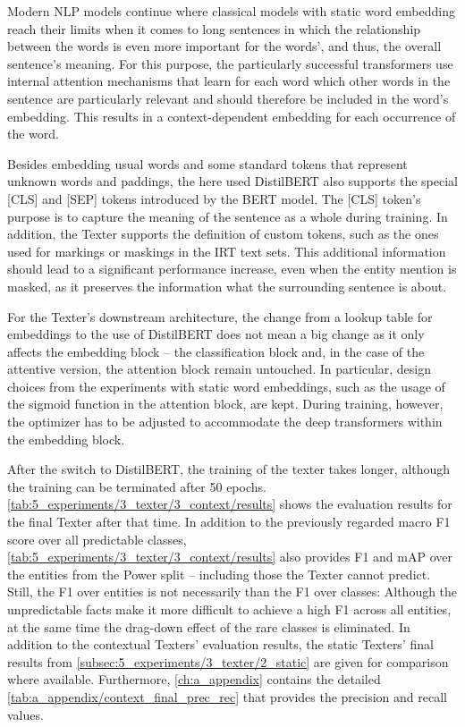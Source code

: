 Modern NLP models continue where classical models with static word embedding reach their limits when it comes to long sentences in which the relationship between the words is even more important for the words', and thus, the overall sentence's meaning. For this purpose, the particularly successful transformers use internal attention mechanisms that learn for each word which other words in the sentence are particularly relevant and should therefore be included in the word's embedding. This results in a context-dependent embedding for each occurrence of the word.

Besides embedding usual words and some standard tokens that represent unknown words and paddings, the here used DistilBERT also supports the special [CLS] and [SEP] tokens introduced by the BERT model. The [CLS] token's purpose is to capture the meaning of the sentence as a whole during training. In addition, the Texter supports the definition of custom tokens, such as the ones used for markings or maskings in the IRT text sets. This additional information should lead to a significant performance increase, even when the entity mention is masked, as it preserves the information what the surrounding sentence is about.

For the Texter's downstream architecture, the change from a lookup table for embeddings to the use of DistilBERT does not mean a big change as it only affects the embedding block -- the classification block and, in the case of the attentive version, the attention block remain untouched. In particular, design choices from the experiments with static word embeddings, such as the usage of the sigmoid function in the attention block, are kept. During training, however, the optimizer has to be adjusted to accommodate the deep transformers within the embedding block.

After the switch to DistilBERT, the training of the texter takes longer, although the training can be terminated after 50 epochs. \autoref{tab:5_experiments/3_texter/3_context/results} shows the evaluation results for the final Texter after that time. In addition to the previously regarded macro F1 score over all predictable classes, \autoref{tab:5_experiments/3_texter/3_context/results} also provides F1 and mAP over the entities from the Power split -- including those the Texter cannot predict. Still, the F1 over entities is not necessarily than the F1 over classes: Although the unpredictable facts make it more difficult to achieve a high F1 across all entities, at the same time the drag-down effect of the rare classes is eliminated. In addition to the contextual Texters' evaluation results, the static Texters' final results from \autoref{subsec:5_experiments/3_texter/2_static} are given for comparison where available. Furthermore, \autoref{ch:a_appendix} contains the detailed \autoref{tab:a_appendix/context_final_prec_rec} that provides the precision and recall values.

